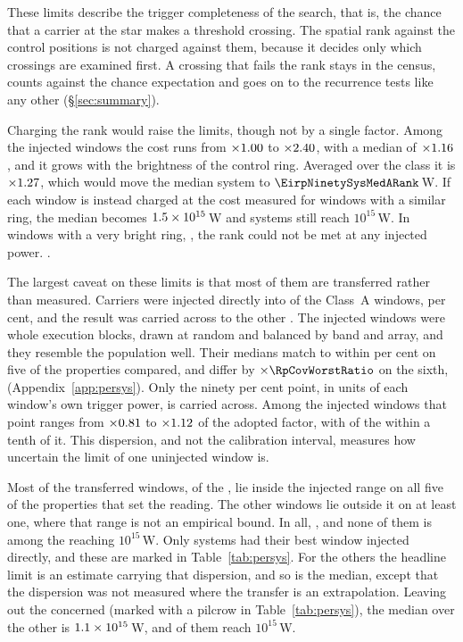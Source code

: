 These limits describe the trigger completeness of the search, that is, the
chance that a carrier at the star makes a threshold crossing. The spatial
rank against the \NCtrl{} control positions is not charged against them,
because it decides only which crossings are examined first. A crossing that
fails the rank stays in the census, counts against the chance expectation
and goes on to the recurrence tests like any other (\S\ref{sec:summary}).

Charging the rank would raise the limits, though not by a single factor.
Among the injected windows the cost runs from $\times1.00$ to
$\times2.40$, with a median of $\times1.16$, and it grows
with the brightness of the control ring. Averaged over the class it is
$\times1.27$, which would move the median system to
$\EirpNinetySysMedARank$\,W. If each window is instead charged at the cost
measured for windows with a similar ring, the median becomes
$1.5\times10^{15}$\,W and \RcNSysEfifteenStrat{} systems still reach
$10^{15}$\,W. In \SensNRingHiUnres{} windows with a very bright ring,
\RcNoRankWins, the rank could not be met at any injected power.
\RcNoRankSysClause.

The largest caveat on these limits is that most of them are transferred
rather than measured. Carriers were injected directly into \SensNInj{} of
the \NWinA{} Class~A windows, \SensNInjPct{} per cent, and the result was
carried across to the other \SensNTransfer. The injected windows were whole
execution blocks, drawn at random and balanced by band and array, and they
resemble the population well. Their medians match to within
\RpCovOtherPct{} per cent on five of the \RpNAxis{} properties compared, and
differ by $\times\RpCovWorstRatio$ on the sixth, \RpCovWorstAxis{}
(Appendix~\ref{app:persys}). Only the ninety per cent point, in units of each
window's own trigger power, is carried across. Among the injected windows
that point ranges from $\times0.81$ to $\times1.12$ of
the adopted factor, with \NmDispNTenth{} of the \SensNInj{} within a tenth of
it. This dispersion, and not the calibration interval, measures how
uncertain the limit of one uninjected window is.

Most of the transferred windows, \NgNInterpWin{} of the \SensNTransfer, lie
inside the injected range on all five of the properties that set the
reading. The other \NgNExtrapWin{} windows lie outside it on at least one,
where that range is not an empirical bound. In all, \NgExtrapTakeClause, and
none of them is among the \NSysEfifteen{} reaching $10^{15}$\,W. Only
\SmcNMeasSys{} systems had their best window injected directly, and these
are marked in Table~\ref{tab:persys}. For the others the headline limit is
an estimate carrying that dispersion, and so is the median, except that the
dispersion was not measured where the transfer is an extrapolation. Leaving
out the \NgNExtrapSys{} \NgExtrapSysNoun{} concerned (marked with a pilcrow
in Table~\ref{tab:persys}), the median over the other \NgNSysInterpSum{} is
$1.1\times10^{15}$\,W, and \NgNSysEfifteenInterp{} of them reach
$10^{15}$\,W.

